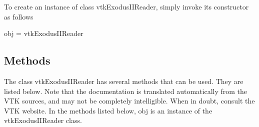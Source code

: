 To create an instance of class vtk\-Exodus\-I\-I\-Reader, simply invoke its constructor as follows \begin{DoxyVerb}  obj = vtkExodusIIReader
\end{DoxyVerb}
 \hypertarget{vtkwidgets_vtkxyplotwidget_Methods}{}\subsection{Methods}\label{vtkwidgets_vtkxyplotwidget_Methods}
The class vtk\-Exodus\-I\-I\-Reader has several methods that can be used. They are listed below. Note that the documentation is translated automatically from the V\-T\-K sources, and may not be completely intelligible. When in doubt, consult the V\-T\-K website. In the methods listed below, {\ttfamily obj} is an instance of the vtk\-Exodus\-I\-I\-Reader class. 
